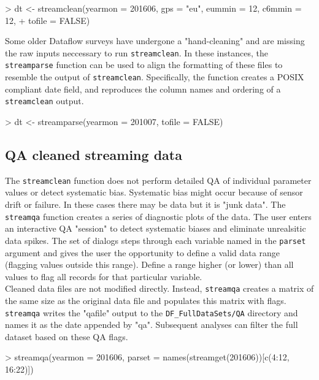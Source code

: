 \documentclass[12pt]{article}
\begin{document}
\begin{Schunk}
\begin{Sinput}
> dt <- streamclean(yearmon = 201606, gps = "eu", eummin = 12, c6mmin = 12,
+       tofile = FALSE)
\end{Sinput}
\end{Schunk}

Some older Dataflow surveys have undergone a "hand-cleaning" and are missing the raw inputs neccessary to run \texttt{streamclean}. In these instances, the \texttt{streamparse} function can be used to align the formatting of these files to resemble the output of \texttt{streamclean}. Specifically, the function creates a POSIX compliant date field, and reproduces the column names and ordering of a \texttt{streamclean} output. 

\begin{Schunk}
\begin{Sinput}
> dt <- streamparse(yearmon = 201007, tofile = FALSE)
\end{Sinput}
\end{Schunk}


\subsection{QA cleaned streaming data}

The \texttt{streamclean} function does not perform detailed QA of individual parameter values or detect systematic bias. Systematic bias might occur because of sensor drift or failure. In these cases there may be data but it is "junk data". The \texttt{streamqa} function creates a series of diagnostic plots of the data. The user enters an interactive QA "session" to detect systematic biases and eliminate unrealsitic data spikes. The set of dialogs steps through each variable named in the \texttt{parset} argument and gives the user the opportunity to define a valid data range (flagging values outside this range). Define a range higher (or lower) than all values to flag all records for that particular variable.\\

Cleaned data files are not modified directly. Instead, \texttt{streamqa} creates a matrix of the same size as the original data file and populates this matrix with flags. \texttt{streamqa} writes the "qafile" output to the \verb|DF_FullDataSets/QA| directory and names it as the date appended by "qa". Subsequent analyses can filter the full dataset based on these QA flags.

\begin{Schunk}
\begin{Sinput}
> streamqa(yearmon = 201606, parset = names(streamget(201606))[c(4:12, 16:22)])
\end{Sinput}
\end{Schunk}
\end{document}
